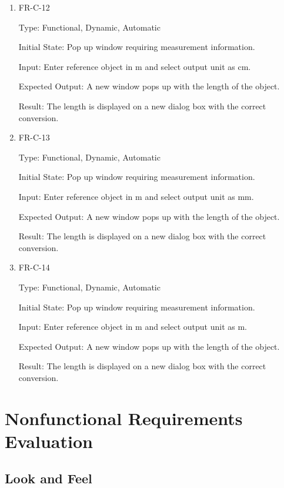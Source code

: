 \documentclass[12pt, titlepage]{article}
\begin{document}
\begin{enumerate}
				\item{FR-C-12\\}
					
					Type: Functional, Dynamic, Automatic
					
					Initial State: Pop up window requiring measurement information.
					
					Input: Enter reference object in m and select output unit as cm.
					
					Expected Output: A new window pops up with the length of the object.
					
					Result: The length is displayed on a new dialog box with the correct conversion.

					\item{FR-C-13\\}
					
					Type: Functional, Dynamic, Automatic
					
					Initial State: Pop up window requiring measurement information.
					
					Input: Enter reference object in m and select output unit as mm.
					
					Expected Output: A new window pops up with the length of the object.
					
					Result: The length is displayed on a new dialog box with the correct conversion.
					
						\item{FR-C-14\\}
					
					Type: Functional, Dynamic, Automatic
					
					Initial State: Pop up window requiring measurement information.
					
					Input: Enter reference object in m and select output unit as m.
					
					Expected Output: A new window pops up with the length of the object.
					
					Result: The length is displayed on a new dialog box with the correct conversion.
				
\end{enumerate}

\section{Nonfunctional Requirements Evaluation}
\subsection{Look and Feel}
		
\end{document}
